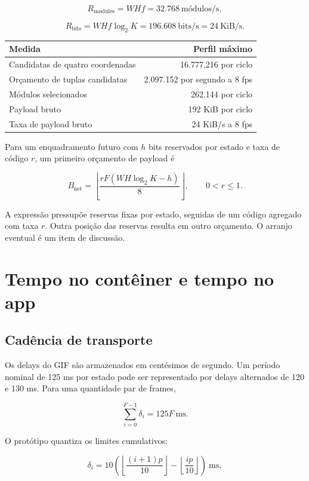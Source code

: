 \documentclass[
  11pt,
  a4paper,
]{article}
\begin{document}
\[
R_{\mathrm{modules}}=WHf=32.768
\ \text{módulos/s},
\]

\[
R_{\mathrm{bits}}=WHf\log_2K
=196.608\ \text{bits/s}
=24\ \text{KiB/s}.
\]

\begin{longtable}[]{@{}lr@{}}
\toprule\noalign{}
Medida & Perfil máximo \\
\midrule\noalign{}
\endhead
\bottomrule\noalign{}
\endlastfoot
Candidatas de quatro coordenadas & 16.777.216 por ciclo \\
Orçamento de tuplas candidatas & 2.097.152 por segundo a 8 fps \\
Módulos selecionados & 262.144 por ciclo \\
Payload bruto & 192 KiB por ciclo \\
Taxa de payload bruto & 24 KiB/s a 8 fps \\
\end{longtable}

Para um enquadramento futuro com \(h\) bits reservados por estado e taxa
de código \(r\), um primeiro orçamento de payload é

\[
B_{\mathrm{net}}=
\left\lfloor\frac{rF(WH\log_2K-h)}8\right\rfloor,
\qquad 0<r\le1.
\]

A expressão pressupõe reservas fixas por estado, seguidas de um código
agregado com taxa \(r\). Outra posição das reservas resulta em outro
orçamento. O arranjo eventual é um item de discussão.

\hypertarget{tempo-no-contuxeainer-e-tempo-no-app}{%
\section{Tempo no contêiner e tempo no
app}\label{tempo-no-contuxeainer-e-tempo-no-app}}

\hypertarget{caduxeancia-de-transporte}{%
\subsection{Cadência de transporte}\label{caduxeancia-de-transporte}}

Os delays do GIF são armazenados em centésimos de segundo. Um período
nominal de 125 ms por estado pode ser representado por delays alternados
de 120 e 130 ms. Para uma quantidade par de frames,

\[
\sum_{i=0}^{F-1}\delta_i=125F\ \text{ms}.
\]

O protótipo quantiza os limites cumulativos:

\[
\delta_i=
10\left(
\left\lfloor\frac{(i+1)p}{10}\right\rfloor
-\left\lfloor\frac{ip}{10}\right\rfloor
\right)\ \text{ms},
\]
\end{document}
